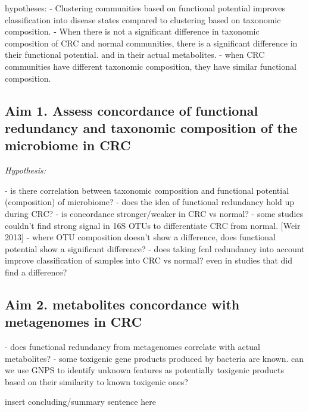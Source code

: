 \documentclass[12pt]{article}
\begin{document}
hypotheses:
- Clustering communities based on functional potential improves classification into disease states compared to clustering based on taxonomic composition.
- When there is not a significant difference in taxonomic composition of CRC and normal communities, there is a significant difference in their functional potential. and in their actual metabolites.
- when CRC communities have different taxonomic composition, they have similar functional composition.

\subsection*{Aim 1. Assess concordance of functional redundancy and taxonomic composition of the microbiome in CRC}
\textit{Hypothesis: }

- is there correlation between taxonomic composition and functional potential (composition) of microbiome?
- does the idea of functional redundancy hold up during CRC?
- is concordance stronger/weaker in CRC vs normal?
- some studies couldn't find strong signal in 16S OTUs to differentiate CRC from normal. [Weir 2013]
    - where OTU composition doesn't show a difference, does functional potential show a significant difference?
    - does taking fcnl redundancy into account improve classification of samples into CRC vs normal? even in studies that did find a difference?

\subsection*{Aim 2. metabolites concordance with metagenomes in CRC}

- does functional redundancy from metagenomes correlate with actual metabolites?
- some toxigenic gene products produced by bacteria are known. can we use GNPS to identify unknown features as potentially toxigenic products based on their similarity to known toxigenic ones?

insert concluding/summary sentence here

\pagebreak

\section*{\refname}
\footnotesize{

\par}
\end{document}
